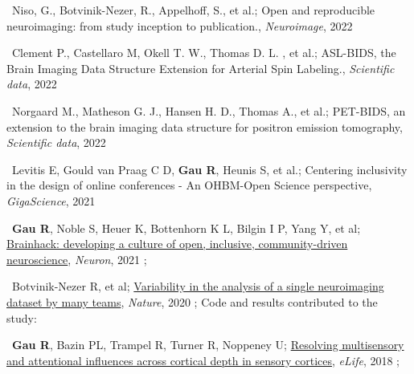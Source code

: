 


\textbullet~Niso, G., Botvinik-Nezer, R., Appelhoff, S., et al.;
Open and reproducible neuroimaging: from study inception to publication.,
\textit{Neuroimage},
2022
\newline
{}

\textbullet~Clement P., Castellaro M, Okell T. W., Thomas D. L. , et al.;
ASL-BIDS, the Brain Imaging Data Structure Extension for Arterial Spin Labeling.,
\textit{Scientific data},
2022
\newline
{}

\textbullet~Norgaard M., Matheson G. J., Hansen H. D., Thomas A., et al.;
PET-BIDS, an extension to the brain imaging data structure for positron emission tomography,
\textit{Scientific data},
2022
\newline
{}

\textbullet~Levitis E, Gould van Praag C D, \textbf{Gau R}, Heunis S, et al.;
Centering inclusivity in the design of online conferences - An OHBM-Open Science perspective,
\textit{GigaScience},
2021
\newline 
{}

\textbullet~\textbf{Gau R}, Noble S, Heuer K, Bottenhorn K L, Bilgin I P, Yang Y, et al; 
\href{https://doi.org/10.1016/j.neuron.2021.04.001}{Brainhack: developing a culture of open, inclusive, community-driven neuroscience}, 
\textit{Neuron}, 
2021
\newline
{}; 

\textbullet~Botvinik-Nezer R, et al; 
\href{https://osf.io/zac8t/}{Variability in the analysis of a single neuroimaging dataset by many teams}, 
\textit{Nature}, 
2020
\newline
{}; 
Code and results contributed to the study:

\smallskip

\textbullet~\textbf{Gau R}, Bazin PL, Trampel R, Turner R, Noppeney U; 
\href{https://osf.io/x3uak/}{Resolving multisensory and attentional influences across cortical depth in sensory cortices}, 
\textit{eLife}, 
2018
\newline
{}; 

